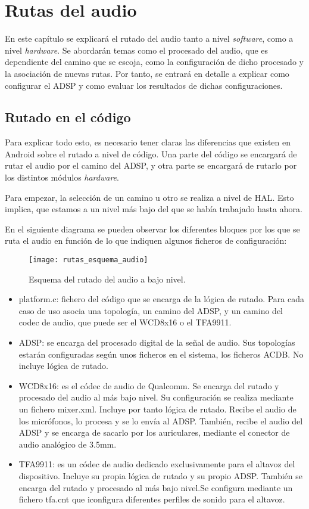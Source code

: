 \chapter{Rutas del audio}\label{chap:rutas_audio}
En este capítulo se explicará el rutado del audio tanto a nivel \textit{software}, como a nivel \textit{hardware}. Se abordarán temas como el procesado del audio, que es dependiente del camino que se escoja, como la configuración de dicho procesado y la asociación de nuevas rutas. Por tanto, se entrará en detalle a explicar como configurar el \gls{ADSP} y como evaluar los resultados de dichas configuraciones.


\section{Rutado en el código}\label{sec:rutado_codigo}
Para explicar todo esto, es necesario tener claras las diferencias que existen en Android sobre el rutado a nivel de código. Una parte del código se encargará de rutar el audio por el camino del \gls{ADSP}, y otra parte se encargará de rutarlo por los distintos módulos \textit{hardware}.

Para empezar, la selección de un camino u otro se realiza a nivel de \gls{HAL}. Esto implica, que estamos a un nivel más bajo del que se había trabajado hasta ahora.

En el siguiente diagrama se pueden observar los diferentes bloques por los que se ruta el audio en función de lo que indiquen algunos ficheros de configuración:

\begin{figure}[H]
	\centering
	\texttt{[image: rutas\_esquema\_audio]}
	\caption{Esquema del rutado del audio a bajo nivel.}
	\label{figrutas_esquema}
\end{figure}

\begin{itemize}
	\item{platform.c: fichero del código que se encarga de la lógica de rutado. Para cada caso de uso asocia una topología, un camino del \gls{ADSP}, y un camino del codec de audio, que puede ser el WCD8x16 o el TFA9911.}
	\item{\gls{ADSP}: se encarga del procesado digital de la señal de audio. Sus topologías estarán configuradas según unos ficheros en el sistema, los ficheros \gls{ACDB}. No incluye lógica de rutado.}
	\item{WCD8x16: es el códec de audio de Qualcomm. Se encarga del rutado y procesado del audio al más bajo nivel. Su configuración se realiza mediante un fichero mixer.xml. Incluye por tanto lógica de rutado. Recibe el audio de los micrófonos, lo procesa y se lo envía al \gls{ADSP}. También, recibe el audio del \gls{ADSP} y se encarga de sacarlo por los auriculares, mediante el conector de audio analógico de 3.5mm.}
	\item{TFA9911: es un códec de audio dedicado exclusivamente para el altavoz del dispositivo. Incluye su propia lógica de rutado y su propio \gls{ADSP}. También se encarga del rutado y procesado al más bajo nivel.Se configura mediante un fichero tfa.cnt que iconfigura diferentes perfiles de sonido para el altavoz.}
\end{itemize}

